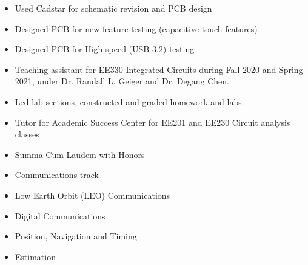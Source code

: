 \documentclass[11pt,a4paper,ragged2e,twocolumn]{altacv}
\begin{document}
\divider

\begin{itemize}
    \item Used Cadstar for schematic revision and PCB design
    \item Designed PCB for new feature testing (capacitive touch features)
    \item Designed PCB for High-speed (USB 3.2) testing

\end{itemize}

\divider

\begin{itemize}
    \item Teaching assistant for EE330 Integrated Circuits during Fall 2020 and Spring 2021,
          under Dr. Randall L. Geiger and Dr. Degang Chen.
    \item Led lab sections, constructed and graded homework and labs
    \item Tutor for Academic Success Center for EE201 and EE230 Circuit analysis classes
\end{itemize}








\divider

\begin{itemize}
    \item Summa Cum Laudem with Honors
    \item Communications track
\end{itemize}
\nocite{*}
\printbibliography[title={Related Work}]


\begin{itemize}
    \item Low Earth Orbit (LEO) Communications
    \item Digital Communications
    \item Position, Navigation and Timing
    \item Estimation
\end{itemize}
\end{document}
